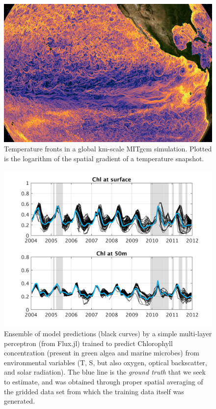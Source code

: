\documentclass{juliacon}[12pt]
\begin{document}
\begin{figure}[th]
\centerline{\includegraphics[width=\columnwidth]{figs/Snapshot_grad_theta.png}}
\caption{Temperature fronts in a global km-scale MITgcm simulation. Plotted is the logarithm of the spatial gradient of a temperature snapshot.}
\label{fig:km_scale}
\end{figure}

\begin{figure}[th] 
\includegraphics[width=\columnwidth]{figs/Chl_av_NN3D5.jpg}
\caption{Ensemble of model predictions (black curves) by a simple multi-layer perceptron (from Flux.jl) trained to predict Chlorophyll concentration (present in green algea and marine microbes) from environmental variables (T, S, but also oxygen, optical backscatter, and solar radiation). The blue line is the {\it ground truth} that we seek to estimate, and was obtained through proper spatial averaging of the gridded data set from which the training data itself was generated.}
\label{fig:MLP}
\end{figure} 
\end{document}
